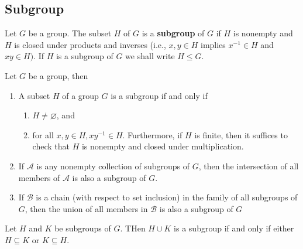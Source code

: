 \subsection{Subgroup} %
\begin{definition}
    Let $G$ be a group. The subset $H$ of $G$ is a \textbf{subgroup} of $G$ if $H$ is nonempty and $H$ is closed under products and inverses (i.e., $x, y \in H$ implies $x^{-1} \in H$ and $x y \in H)$. If $H$ is a subgroup of $G$ we shall write $H \leq G$.
\end{definition}


\begin{proposition}
    Let $G$ be a group, then
    \begin{enumerate}
        \item
              A subset $H$ of a group $G$ is a subgroup if and only if
              \begin{enumerate}[label=(\roman*)]
                  \item $H \neq \varnothing $, and

                  \item for all $x, y \in H, x y^{-1} \in H$.
                        Furthermore, if $H$ is finite, then it suffices to check that $H$ is nonempty and closed under multiplication.
              \end{enumerate}

        \item
              If $\mathcal{A}$ is any nonempty collection of subgroups of $G$, then the intersection of all members of $\mathcal{A}$ is also a subgroup of $G$.
        \item
              If $\mathcal{B}$ is a chain (with respect to set inclusion) in the family of all subgroups of $G$, then the union of all members in $\mathcal{B}$ is also a subgroup of $G$
    \end{enumerate}
\end{proposition}
\begin{proposition}
    Let $H$ and $K$ be subgroups of $G$. THen $H \cup K$ is a subgroup if and only if either $H \subseteq K$ or $K \subseteq H$.
\end{proposition}




